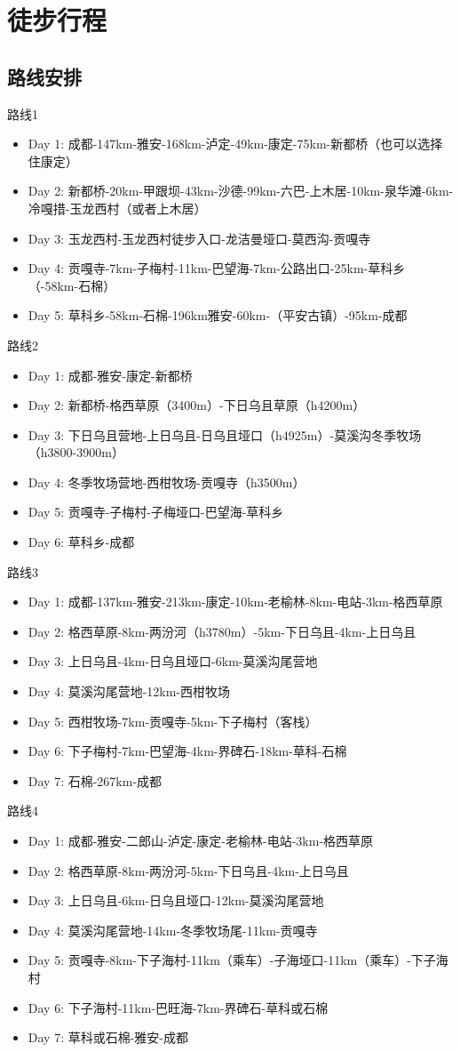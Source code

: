 \section{徒步行程}
\subsection{路线安排}
路线1
\begin{itemize}
  \item Day 1: 成都-147km-雅安-168km-泸定-49km-康定-75km-新都桥（也可以选择住康定）
  \item Day 2: 新都桥-20km-甲跟坝-43km-沙德-99km-六巴-上木居-10km-泉华滩-6km-冷嘎措-玉龙西村（或者上木居）
  \item Day 3: 玉龙西村-玉龙西村徒步入口-龙洁曼垭口-莫西沟-贡嘎寺
  \item Day 4: 贡嘎寺-7km-子梅村-11km-巴望海-7km-公路出口-25km-草科乡（-58km-石棉）
  \item Day 5: 草科乡-58km-石棉-196km雅安-60km-（平安古镇）-95km-成都
\end{itemize}
路线2
\begin{itemize}
  \item Day 1: 成都-雅安-康定-新都桥
  \item Day 2: 新都桥-格西草原（3400m）-下日乌且草原（h4200m）
  \item Day 3: 下日乌且营地-上日乌且-日乌且垭口（h4925m）-莫溪沟冬季牧场（h3800-3900m）
  \item Day 4: 冬季牧场营地-西柑牧场-贡嘎寺（h3500m）
  \item Day 5: 贡嘎寺-子梅村-子梅垭口-巴望海-草科乡
  \item Day 6: 草科乡-成都
\end{itemize}
路线3
\begin{itemize}
  \item Day 1: 成都-137km-雅安-213km-康定-10km-老榆林-8km-电站-3km-格西草原
  \item Day 2: 格西草原-8km-两汾河（h3780m）-5km-下日乌且-4km-上日乌且
  \item Day 3: 上日乌且-4km-日乌且垭口-6km-莫溪沟尾营地
  \item Day 4: 莫溪沟尾营地-12km-西柑牧场
  \item Day 5: 西柑牧场-7km-贡嘎寺-5km-下子梅村（客栈）
  \item Day 6: 下子梅村-7km-巴望海-4km-界碑石-18km-草科-石棉
  \item Day 7: 石棉-267km-成都
\end{itemize}
路线4
\begin{itemize}
  \item Day 1: 成都-雅安-二郎山-泸定-康定-老榆林-电站-3km-格西草原
  \item Day 2: 格西草原-8km-两汾河-5km-下日乌且-4km-上日乌且
  \item Day 3: 上日乌且-6km-日乌且垭口-12km-莫溪沟尾营地
  \item Day 4: 莫溪沟尾营地-14km-冬季牧场尾-11km-贡嘎寺
  \item Day 5: 贡嘎寺-8km-下子海村-11km（乘车）-子海垭口-11km（乘车）-下子海村
  \item Day 6: 下子海村-11km-巴旺海-7km-界碑石-草科或石棉
  \item Day 7: 草科或石棉-雅安-成都
\end{itemize}
